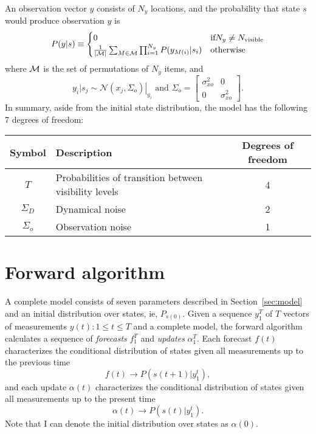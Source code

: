 \documentclass[12pt]{article}
\newcommand{\NormalE}[3]{{\mathcal{N}}\left.\left(#1,#2\right)\right|_{#3}}
\newcommand{\M}{{\cal M}}
\begin{document}
An observation vector $y$ consists of $N_y$ locations, and the
probability that state $s$ would produce observation $y$ is
\begin{equation}
  \label{eq:ob}
  P(y|s) \equiv
  \begin{cases}
    0 & \text{if} N_y \neq N_{\text{visible}} \\
    \frac{1}{\left|\M \right|} \sum_{M \in \M}
    \prod_{i=1}^{N_y} P(y_{M(i)}|s_i) & \text{otherwise}
  \end{cases}
\end{equation}
where $\M$ is the set of permutations of $N_y$ items, and
\begin{equation*}
  y_i|s_j \sim \NormalE{x_j}{\Sigma_o}{y_i} \text{ and }
  \Sigma_o = \begin{bmatrix} \sigma_{xo}^2 & 0 \\ 0 &
    \sigma_{xo}^2 \end{bmatrix}.
\end{equation*}
In summary, aside from the initial state distribution, the model has
the following 7 degrees of freedom:
\begin{center}
  \begin{tabular}{|cp{15em}c|}
    \hline
    Symbol & Description & Degrees of freedom \\
    \hline
    $T$ & Probabilities of transition between visibility levels & 4 \\
    $\Sigma_D$ & Dynamical noise & 2 \\
    $\Sigma_o$ & Observation noise & 1 \\
    \hline
  \end{tabular} 
\end{center}

\section{Forward algorithm}
\label{sec:forward}

A complete model consists of seven parameters described in
Section~\ref{sec:model} and an initial distribution over states, ie,
$P_{s(0)}$.  Given a sequence $y_1^T$ of $T$ vectors of measurements
$y(t):1 \leq t \leq T$ and a complete model, the forward algorithm
calculates a sequence of \emph{forecasts} $f_1^T$ and \emph{updates}
$\alpha_1^T$.  Each forecast $f(t)$ characterizes the conditional
distribution of states given all measurements up to the previous time
\begin{equation*}
  f(t) \rightarrow P(s(t+1)|y_1^t),
\end{equation*}
and each update $\alpha(t)$ characterizes the conditional distribution
of states given all measurements up to the present time
\begin{equation*}
  \alpha(t) \rightarrow P(s(t)|y_1^t).
\end{equation*}
Note that I can denote the initial distribution over states as
$\alpha(0)$.
\end{document}
